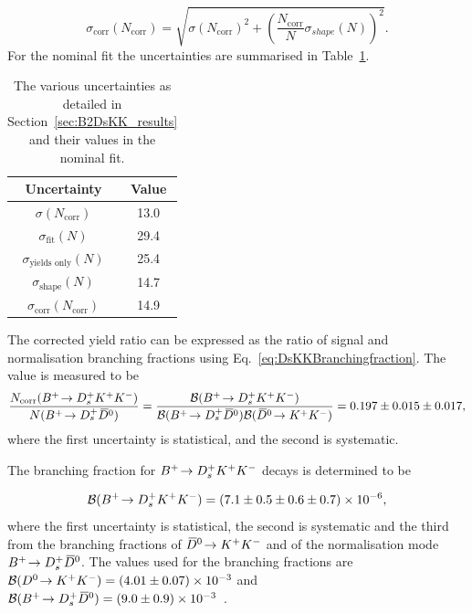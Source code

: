 \begin{equation}
\sigma_{\text{corr}}(N_{\text{corr}}) =  \sqrt{  \sigma(N_{\text{corr}})^{2} +  \left( \frac{N_{\text{corr}}}{N} \sigma_{shape}(N) \right)^{2}}.
\end{equation}
For the nominal fit the uncertainties are summarised in Table~\ref{table:DsKK_fit_errors}.

\begin{table}[!ht]
\begin{center}
\begin{tabular}{  c | c   }
\hline
Uncertainty                             &  Value \\
\hline 
$\sigma(N_{\text{corr}})$               & 13.0\\
$\sigma_{\text{fit}}(N)$                & 29.4\\
$\sigma_{\text{yields only}}(N)$        & 25.4\\
$\sigma_{\text{shape}}(N)$              & 14.7 \\ 
\hline
$\sigma_{\text{corr}}(N_{\text{corr}})$ & 14.9 \\ 
\hline
\end{tabular}
\caption{The various uncertainties as detailed in Section~\ref{sec:B2DsKK_results} and their values in the nominal fit.}
\label{table:DsKK_fit_errors}
\end{center}
\end{table}

The corrected yield ratio can be expressed as the ratio of signal and normalisation branching fractions using Eq.~\ref{eq:DsKKBranchingfraction}. The value is measured to be 
\begin{equation}
\frac{ N_{\text{corr}}({{{B}^+}}\!\rightarrow {\ensuremath{{D}^+_{s}}}{\ensuremath{{K}^+}}{\ensuremath{{K}^-}}) }{ N({{{B}^+}}\!\rightarrow {\ensuremath{{D}^+_{s}}}{\ensuremath{{\kern 0.2em\overline{\kern -0.2em D}{}}{}^0}}) } = \frac{\mathcal{B}({{{B}^+}}\!\rightarrow {\ensuremath{{D}^+_{s}}}{\ensuremath{{K}^+}}{\ensuremath{{K}^-}})}{\mathcal{B}({{{B}^+}}\!\rightarrow {\ensuremath{{D}^+_{s}}}{\ensuremath{{\kern 0.2em\overline{\kern -0.2em D}{}}{}^0}})\mathcal{B}({{\kern 0.2em\overline{\kern -0.2em D}{}}{}^0}\!\rightarrow {\ensuremath{{K}^+}}{\ensuremath{{K}^-}})}  = 0.197 \pm 0.015 \pm 0.017, 
\end{equation}
where the first uncertainty is statistical, and the second is systematic.

The branching fraction for ${{{B}^+}}\!\rightarrow {\ensuremath{{D}^+_{s}}}{\ensuremath{{K}^+}}{\ensuremath{{K}^-}}$ decays is determined to be 

\begin{equation}
\mathcal{B}({{{B}^+}}\!\rightarrow {\ensuremath{{D}^+_{s}}}{\ensuremath{{K}^+}}{\ensuremath{{K}^-}}) = (7.1 \pm 0.5 \pm 0.6 \pm 0.7) \times 10^{-6},
\end{equation}
where the first uncertainty is statistical, the second is systematic and the third from the branching fractions of ${{\kern 0.2em\overline{\kern -0.2em D}{}}{}^0}\!\rightarrow {\ensuremath{{K}^+}}{\ensuremath{{K}^-}}$ and of the normalisation mode ${{{B}^+}}\!\rightarrow {\ensuremath{{D}^+_{s}}}{\ensuremath{{\kern 0.2em\overline{\kern -0.2em D}{}}{}^0}}$. 
The values used for the branching fractions are $\mathcal{B}({{D}^0}\!\rightarrow {\ensuremath{{K}^+}}{\ensuremath{{K}^-}}) = (4.01 \pm 0.07)\times10^{-3}$ and $\mathcal{B}({{{B}^+}}\!\rightarrow {\ensuremath{{D}^+_{s}}}{\ensuremath{{\kern 0.2em\overline{\kern -0.2em D}{}}{}^0}}) = (9.0 \pm 0.9)\times10^{-3}$~\cite{PDG2016}. 

